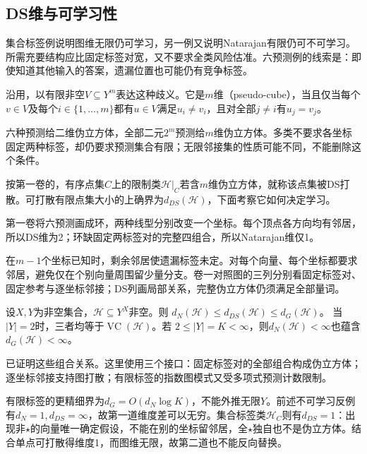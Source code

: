 \subsection{DS维与可学习性}
\label{sec:ds-dimension}

集合标签例说明图维无限仍可学习，另一例又说明Natarajan有限仍可不可学习。所需充要结构应比固定标签对宽，又不要求全类风险估准。六预测例的线索是：即使知道其他输入的答案，遗漏位置也可能仍有竞争标签。

沿用，以有限非空$V\subseteq Y^m$表达这种歧义。它是$m$维（pseudo-cube），当且仅当每个$v\in V$及每个$i\in\{1,\ldots,m\}$都有$u\in V$满足$u_i\neq v_i$，且对全部$j\neq i$有$u_j=v_j$。

六种预测给二维伪立方体，全部二元$2^m$预测给$m$维伪立方体。多类不要求各坐标固定两种标签，却仍要求预测集合有限；无限邻接集的性质可能不同，不能删除这个条件。

按第一卷的，有序点集$C$上的限制类$\mathcal H|_C$若含$m$维伪立方体，就称该点集被DS打散。可打散有限点集大小的上确界为$d_{DS}(\mathcal H)$，下面考察它如何决定学习。

第一卷将六预测画成环，两种线型分别改变一个坐标。每个顶点各方向均有邻居，所以DS维为2；环缺固定两标签对的完整四组合，所以Natarajan维仅1。

在$m-1$个坐标已知时，剩余邻居使遗漏标签未定。对每个向量、每个坐标都要求邻居，避免仅在个别向量周围留少量分支。卷一对照图的三列分别看固定标签对、固定参考与逐坐标邻接；DS列画局部关系，完整伪立方体仍须满足全部量词。

\begin{theorem}[多分类维度的比较]
\label{thm:learning-multiclass-dimension-comparison}
设$X,Y$为非空集合，$\mathcal H\subseteq Y^X$非空。则
$d_N(\mathcal H)\leq d_{DS}(\mathcal H)\leq d_G(\mathcal H)$。
当$|Y|=2$时，三者均等于$\operatorname{VC}(\mathcal H)$。若
$2\leq|Y|=K<\infty$，则$d_N(\mathcal H)<\infty$也蕴含
$d_G(\mathcal H)<\infty$。
\end{theorem}

已证明这些组合关系。这里使用三个接口：固定标签对的全部组合构成伪立方体；逐坐标邻接支持图打散；有限标签的指数图模式又受多项式预测计数限制。

有限标签的更精细界为$d_G=O(d_N\log K)$，不能外推无限$Y$。前述不可学习反例有$d_N=1,d_{DS}=\infty$，故第一道维度差可以无穷。集合标签类$\mathcal H_C$则有$d_{DS}=1$：出现非$\star$的向量唯一确定假设，不能在别的坐标留邻居，全$\star$独自也不是伪立方体。结合单点可打散得维度1，而图维无限，故第二道也不能反向替换。

